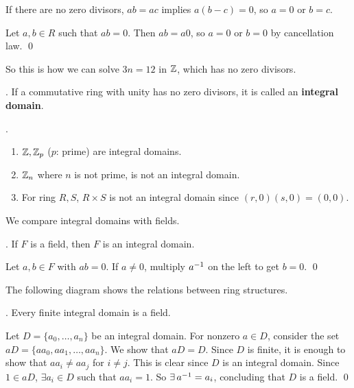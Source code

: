 \pf \note{\mimpd} If there are no zero divisors, \(ab = ac\) implies \(a(b - c) = 0\), so \(a = 0\) or \(b = c\).

\note{\mimp} Let \(a, b \in R\) such that \(ab = 0\). Then \(ab = a0\), so \(a = 0\) or \(b = 0\) by cancellation law. \qed

So this is how we can solve \(3n = 12\) in \(\mathbb{Z}\), which has no zero divisors.

.  If a commutative ring with unity has no zero divisors, it is called an \textbf{integral domain}.

\ex.
\begin{enumerate}
    \item \(\mathbb{Z}, \mathbb{Z}_p\) (\(p\): prime) are integral domains.
    \item \(\mathbb{Z}_n\) where \(n\) is not prime, is not an integral domain.
    \item For ring \(R, S\), \(R \times S\) is not an integral domain since \((r, 0)(s, 0) = (0, 0)\).
\end{enumerate}

We compare integral domains with fields.

\thm. If \(F\) is a field, then \(F\) is an integral domain.

\pf Let \(a, b \in F\) with \(ab = 0\). If \(a \neq 0\), multiply \(a^{-1}\) on the left to get \(b = 0\). \qed

The following diagram shows the relations between ring structures.

\begin{center}
\end{center}

\thm. Every finite integral domain is a field.

\pf Let \(D = \{a_0, \dots, a_n\}\) be an integral domain. For nonzero \(a \in D\), consider the set \(aD = \{aa_0, aa_1, \dots, aa_n\}\). We show that \(aD = D\). Since \(D\) is finite, it is enough to show that \(aa_i \neq aa_j\) for \(i \neq j\). This is clear since \(D\) is an integral domain. Since \(1 \in aD\), \(\exists a_i \in D\) such that \(a a_i = 1\). So \(\exists a\inv = a_i\), concluding that \(D\) is a field. \qed

